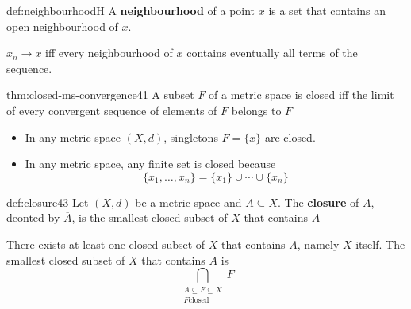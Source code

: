 \documentclass[landscape, 8pt]{extarticle}
\begin{document}
\begin{multicols}{3}
\begin{dfn}{def:neighbourhood}{H}
    \vspace{-2pt}
    \longrule{0.08ex}
    A \textbf{neighbourhood} of a point $x$ is a set that contains an open neighbourhood of $x$.

    $x_{n}\to x$ iff every neighbourhood of $x$ contains eventually all terms of the sequence.
\end{dfn}

\newpage
\begin{thm}[]{thm:closed-ms-convergence}{41}
    \vspace{-5pt}
    A subset $F$ of a metric space is closed iff the limit of every convergent sequence of elements of $F$ belongs to $F$

    \longrule{0.08ex}
    \vspace{-13pt}
    \begin{itemize}[leftmargin=*]
        \item In any metric space $(X,d)$, singletons $F = \{x\}$ are closed.
        \item In any metric space, any finite set is closed because
            \[\{x_{1},\dots,x_{n}\} = \{x_{1}\}\cup \cdots \cup \{x_{n}\}\]
    \end{itemize}
\end{thm}

\begin{dfn}[Closure]{def:closure}{43}
    \vspace{-5pt}
    Let $(X, d)$ be a metric space and $A \subseteq X$. The \textbf{closure} of $A$, deonted by $\overline{A}$, is the smallest closed subset of $X$ that contains $A$

    There exists at least one closed subset of $X$ that contains $A$, namely $X$ itself. The smallest closed subset of $X$ that contains $A$ is
    \[\bigcap\limits_{\substack{A \subseteq F \subseteq X\\
    F \text{closed}}} F\]
\end{dfn}


\end{multicols}
\end{document}
